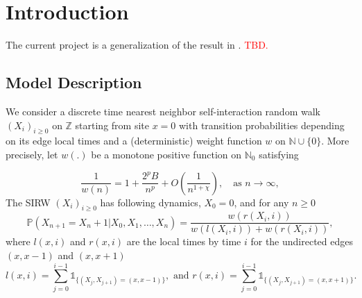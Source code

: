 \documentclass[twoside,12pt,a4paper]{article}
\numberwithin{equation}{section}
\newcommand\TBD{\textcolor{red}{TBD.}}
\begin{document}
	\maketitle
	
	\begin{abstract}
		This document is an outline of the article for the Scaling limit of SIRW. We generalize the functional CLT in \cite{KMP22} for the asymptotically free self-interacting random walk (AF-SIRW) in the case $0<p \leq \frac{1}{2}$. The approach is to carefully approximate the local drifts of the random walk via the study of the directed edge local times, which are described by branching-like processes and generalized Ray-knight Theorems. Xiaoyu Liu and Zhe Wang are working on this project. 
		\TBD
	\end{abstract}
	
	\section{Introduction}
	The current project is a generalization of the result in \cite{KMP22}. 
	\TBD 
	
	
	\subsection{Model Description} 
	We consider a discrete time nearest neighbor self-interaction random walk $(X_i)_{i\geq 0}$ on $\mathbb{Z}$ starting from site $x=0$ with transition probabilities depending on its edge local times and a (deterministic) weight function $w$ on $\mathbb{N}\cup \{0\}$. More precisely, let $w(.)$ be a monotone positive function on $\mathbb{N}_0$ satisfying
	
	\begin{equation}\label{eq: asymptotics of w}
		\frac{1}{w(n)} = 1+\frac{2^p B}{n^p} + O\left(\frac{1}{n^{1+\mathcal{\chi}}}\right), \quad \mbox{as $n\to \infty$}, 	
	\end{equation} 
	The SIRW $(X_i)_{i\geq 0}$ has following dynamics, 
	$X_0 = 0$, and for any $n\geq 0$
	\begin{equation}\label{dynamic}
		\mathbb{P}\left( X_{n+1} =  X_n +1 | X_0,X_1,\dots,X_n   \right) =  \frac{  w(r(X_i,i) )}{ w(l(X_i,i))  + w(r(X_i,i))   },
	\end{equation}
	where $l(x,i)$ and $r(x,i)$ are the local times by time $i$ for the undirected edges $(x,x-1)$ and $(x,x+1)$
	$$ l(x,i) = \sum_{j=0}^{i-1} \mathbb{1}_{ \{  (X_j, X_{j+1}) =  (x,x-1) \} }, \mbox{ and }  r(x,i) = \sum_{j=0}^{i-1} \mathbb{1}_{ \{  (X_j, X_{j+1}) =  (x,x+1) \} }.        $$
	
\end{document}
